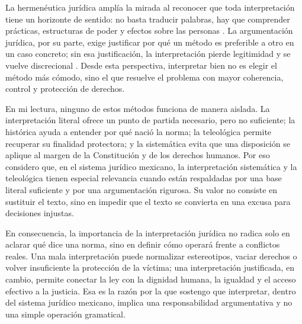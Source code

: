 \documentclass[
	spanish,
	letterpaper, oneside
]{article}
\begin{document}
La hermenéutica jurídica amplía la mirada al reconocer que toda interpretación tiene un horizonte de sentido: no basta traducir palabras, hay que comprender prácticas, estructuras de poder y efectos sobre las personas \citep{hernandezManriquezHermeneutica2019}. La argumentación jurídica, por su parte, exige justificar por qué un método es preferible a otro en un caso concreto; sin esa justificación, la interpretación pierde legitimidad y se vuelve discrecional \citep{scjnMemoriaArgumentacion2008}. Desde esta perspectiva, interpretar bien no es elegir el método más cómodo, sino el que resuelve el problema con mayor coherencia, control y protección de derechos.

En mi lectura, ninguno de estos métodos funciona de manera aislada. La interpretación literal ofrece un punto de partida necesario, pero no suficiente; la histórica ayuda a entender por qué nació la norma; la teleológica permite recuperar su finalidad protectora; y la sistemática evita que una disposición se aplique al margen de la Constitución y de los derechos humanos. Por eso considero que, en el sistema jurídico mexicano, la interpretación sistemática y la teleológica tienen especial relevancia cuando están respaldadas por una base literal suficiente y por una argumentación rigurosa. Su valor no consiste en sustituir el texto, sino en impedir que el texto se convierta en una excusa para decisiones injustas.

En consecuencia, la importancia de la interpretación jurídica no radica solo en aclarar qué dice una norma, sino en definir cómo operará frente a conflictos reales. Una mala interpretación puede normalizar estereotipos, vaciar derechos o volver insuficiente la protección de la víctima; una interpretación justificada, en cambio, permite conectar la ley con la dignidad humana, la igualdad y el acceso efectivo a la justicia. Esa es la razón por la que sostengo que interpretar, dentro del sistema jurídico mexicano, implica una responsabilidad argumentativa y no una simple operación gramatical.
\end{document}
